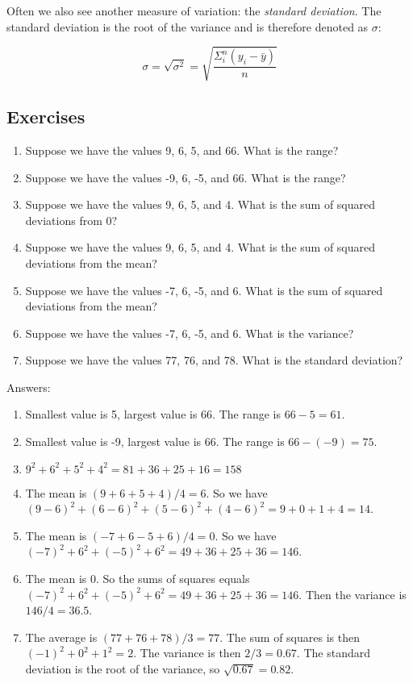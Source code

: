 Often we also see another measure of variation: the \textit{standard deviation}. The standard deviation is the root of the variance and is therefore denoted as $\sigma$:

\begin{equation}
\sigma = \sqrt{\sigma^2}=\sqrt{  \frac{\Sigma_i^n (y_i-\bar{y})}{n}}
\end{equation}


\subsection{Exercises}

\begin{enumerate}
\item Suppose we have the values 9, 6, 5, and 66. What is the range?
\item Suppose we have the values -9, 6, -5, and 66. What is the range?
\item Suppose we have the values 9, 6, 5, and 4. What is the sum of squared deviations from 0?
\item Suppose we have the values 9, 6, 5, and 4. What is the sum of squared deviations from the mean?
\item Suppose we have the values -7, 6, -5, and 6. What is the sum of squared deviations from the mean?
\item Suppose we have the values -7, 6, -5, and 6. What is the variance?
\item Suppose we have the values 77, 76, and 78. What is the standard deviation?
\end{enumerate}

Answers:


\begin{enumerate}
\item Smallest value is 5, largest value is 66. The range is $66-5=61$.
\item Smallest value is -9, largest value is 66. The range is $66-(-9)=75$.
\item $9^2+6^2+5^2+4^2=81+36+25+16=158$
\item The mean is $(9+6+5+4)/4=6$. So we have $(9-6)^2+(6-6)^2+(5-6)^2+(4-6)^2=9+0+1+4=14$.
\item The mean is $(-7+6-5+6)/4=0$. So we have $(-7)^2+6^2+(-5)^2+6^2=49+36+25+36=146$.
\item The mean is 0. So the sums of squares equals $(-7)^2+6^2+(-5)^2+6^2=49+36+25+36=146$. Then the variance is $146/4=36.5$.
\item The average is $(77+76+78)/3=77$. The sum of squares is then $(-1)^2+0^2+1^2=2$. The variance is then $2/3=0.67$. The standard deviation is the root of the variance, so $\sqrt{0.67}=0.82$.
\end{enumerate}

